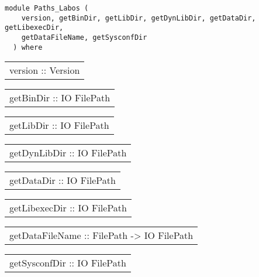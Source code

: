 \label{module:Paths_Labos}
\haddockbeginheader
{\haddockverb\begin{verbatim}
module Paths_Labos (
    version, getBinDir, getLibDir, getDynLibDir, getDataDir, getLibexecDir,
    getDataFileName, getSysconfDir
  ) where\end{verbatim}}
\haddockendheader

\begin{haddockdesc}
\item[\begin{tabular}{@{}l}
version :: Version
\end{tabular}]
\item[\begin{tabular}{@{}l}
getBinDir :: IO FilePath
\end{tabular}]
\item[\begin{tabular}{@{}l}
getLibDir :: IO FilePath
\end{tabular}]
\item[\begin{tabular}{@{}l}
getDynLibDir :: IO FilePath
\end{tabular}]
\item[\begin{tabular}{@{}l}
getDataDir :: IO FilePath
\end{tabular}]
\item[\begin{tabular}{@{}l}
getLibexecDir :: IO FilePath
\end{tabular}]
\item[\begin{tabular}{@{}l}
getDataFileName :: FilePath -> IO FilePath
\end{tabular}]
\item[\begin{tabular}{@{}l}
getSysconfDir :: IO FilePath
\end{tabular}]
\end{haddockdesc}